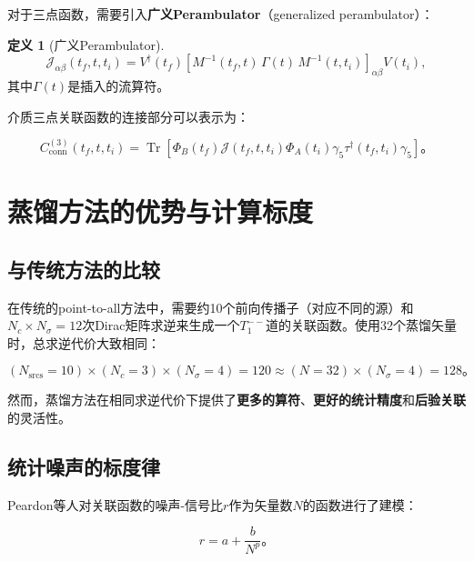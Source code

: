 \documentclass[12pt,a4paper]{ctexart}
\theoremstyle{definition}
\newtheorem{definition}{定义}[section]
\begin{document}
对于三点函数，需要引入\textbf{广义Perambulator}（generalized perambulator）\cite{Peardon2009}：

\begin{definition}[广义Perambulator]
\begin{equation}
\mathcal{J}_{\alpha\beta}(t_f, t, t_i) = V^\dagger(t_f) \left[ M^{-1}(t_f, t) \, \Gamma(t) \, M^{-1}(t, t_i) \right]_{\alpha\beta} V(t_i),
\label{eq:generalized_perambulator}
\end{equation}
其中$\Gamma(t)$是插入的流算符。
\end{definition}

介质三点关联函数的连接部分可以表示为：

\begin{equation}
C^{(3)}_{\text{conn}}(t_f, t, t_i) = \operatorname{Tr}\left[ \Phi_B(t_f) \mathcal{J}(t_f, t, t_i) \Phi_A(t_i) \gamma_5 \tau^\dagger(t_f, t_i) \gamma_5 \right]。
\label{eq:3pt_factorized}
\end{equation}

\section{蒸馏方法的优势与计算标度}

\subsection{与传统方法的比较}

在传统的point-to-all方法中，需要约10个前向传播子（对应不同的源）和$N_c \times N_\sigma = 12$次Dirac矩阵求逆来生成一个$T_1^{--}$道的关联函数。使用32个蒸馏矢量时，总求逆代价大致相同\cite{Peardon2009}：

\begin{equation}
(N_{\text{srcs}} = 10) \times (N_c = 3) \times (N_\sigma = 4) = 120 \approx (N = 32) \times (N_\sigma = 4) = 128。
\label{eq:cost_comparison}
\end{equation}

然而，蒸馏方法在相同求逆代价下提供了\textbf{更多的算符}、\textbf{更好的统计精度}和\textbf{后验关联}的灵活性。

\subsection{统计噪声的标度律}

Peardon等人\cite{Peardon2009}对关联函数的噪声-信号比$r$作为矢量数$N$的函数进行了建模：

\begin{equation}
r = a + \frac{b}{N^p}。
\label{eq:noise_scaling}
\end{equation}
\end{document}
